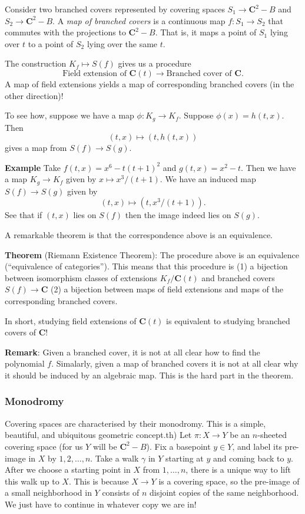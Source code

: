 \documentclass[11pt]{article}
\begin{document}
Consider two branched covers represented by covering spaces \(S_1 \to \mathbf{C}^2-B\) and \(S_2 \to \mathbf{C}^2-B\).
A \emph{map of branched covers} is a continuous map \(f \colon S_1 \to S_2\) that commutes with the projections to \(\mathbf{C}^2-B\).
That is, it maps a point of \(S_1\) lying over \(t\) to a point of \(S_2\) lying over the same \(t\).

The construction \(K_f \mapsto S(f)\) gives us a procedure
\[ \text{Field extension of } \mathbf{C}(t)  \to \text{Branched cover of } \mathbf{C}.\]
A map of field extensions yields a map of corresponding branched covers (in the other direction)!

To see how, suppose we have a map \(\phi \colon K_g \to K_f\).
Suppose \(\phi(x) = h(t,x)\).
Then
\[ (t,x) \mapsto (t, h(t,x))\]
gives a map from \(S(f) \to S(g)\).

\textbf{\textbf{Example}}
Take \(f(t,x) = x^6-t(t+1)^{2}\) and \(g(t,x) = x^2 - t\).
Then we have a map \(K_g \to K_f\) given by \(x \mapsto x^3/(t+1)\).
We have an induced map \(S(f) \to S(g)\) given by
\[ (t,x) \mapsto (t,x^3/(t+1)).\]
See that if \((t,x)\) lies on \(S(f)\) then the image indeed lies on \(S(g)\).

A remarkable theorem is that the correspondence above is an equivalence.

\textbf{\textbf{Theorem}} (Riemann Existence Theorem):
The procedure above is an equivalence (``equivalence of categories'').
This means that this procedure is (1) a bijection between isomorphism classes of extensions \(K_f / \mathbf{C}(t)\) and branched covers \(S(f) \to \mathbf{C}\)  (2) a bijection between maps of field extensions and maps of the corresponding branched covers.

In short, studying field extensions of \(\mathbf{C}(t)\) is equivalent to studying branched covers of \(\mathbf{C}\)!

\textbf{\textbf{Remark}}: Given a branched cover, it is not at all clear how to find the polynomial \(f\).  Simalarly, given a map of branched covers it is not at all clear why it should be induced by an algebraic map.  This is the hard part in the theorem.
\subsubsection{Monodromy}
\label{sec:orgd4a7b2d}
Covering spaces are characterised by their monodromy.
This is a simple, beautiful, and ubiquitous geometric concept.th)
Let \(\pi \colon X \to Y\) be an \(n\)-sheeted covering space (for us \(Y\) will be \(\mathbf{C}^2 - B\)).
Fix a basepoint \(y \in Y\), and label its pre-image in \(X\) by \(1,2,\dots,n\).
Take a walk \(\gamma\) in \(Y\) starting at \(y\) and coming back to \(y\).
After we choose a starting point in \(X\) from \(1,\dots, n\), there is a unique way to lift this walk up to \(X\).
This is because \(X \to Y\) is a covering space, so the pre-image of a small neighborhood in \(Y\) consists of \(n\) disjoint copies of the same neighborhood.
We just have to continue in whatever copy we are in!
\end{document}
